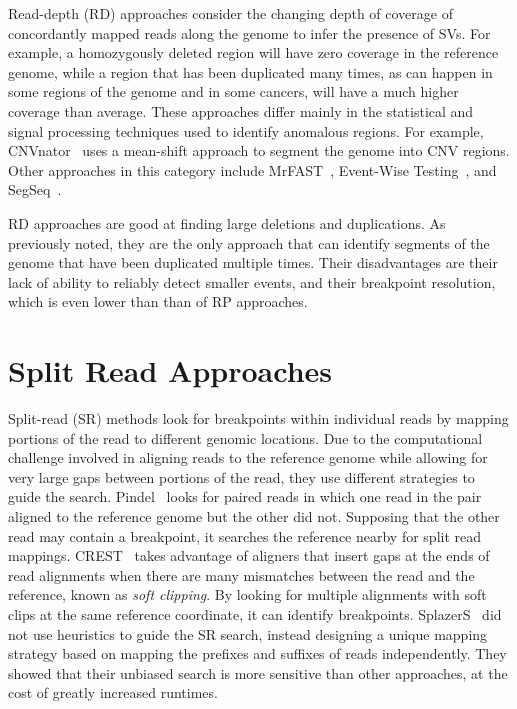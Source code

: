 Read-depth (RD) approaches consider the changing depth of coverage of concordantly mapped reads along the genome to infer the presence of SVs. For example, a homozygously deleted region will have zero coverage in the reference genome, while a region that has been duplicated many times, as can happen in some regions of the genome and in some cancers, will have a much higher coverage than average. These approaches differ mainly in the statistical and signal processing techniques used to identify anomalous regions. For example, CNVnator~\cite{Abyzov:2011bk} uses a mean-shift approach to segment the genome into CNV regions. Other approaches in this category include MrFAST~\cite{Alkan:2009cr}, Event-Wise Testing~\cite{Yoon:2009kb}, and SegSeq~\cite{Chiang:2009di}.

RD approaches are good at finding large deletions and duplications. As previously noted, they are the only approach that can identify segments of the genome that have been duplicated multiple times. Their disadvantages are their lack of ability to reliably detect smaller events, and their breakpoint resolution, which is even lower than than of RP approaches.

\section{Split Read Approaches}

Split-read (SR) methods look for breakpoints within individual reads by mapping portions of the read to different genomic locations. Due to the computational challenge involved in aligning reads to the reference genome while allowing for very large gaps between portions of the read, they use different strategies to guide the search. Pindel~\cite{Ye:2009p2} looks for paired reads in which one read in the pair aligned to the reference genome but the other did not. Supposing that the other read may contain a breakpoint, it searches the reference nearby for split read mappings. CREST~\cite{Wang:2011p1607} takes advantage of aligners that insert gaps at the ends of read alignments when there are many mismatches between the read and the reference, known as \emph{soft clipping}. By looking for multiple alignments with soft clips at the same reference coordinate, it can identify breakpoints. SplazerS~\cite{Emde:2012fb} did not use heuristics to guide the SR search, instead designing a unique mapping strategy based on mapping the prefixes and suffixes of reads independently. They showed that their unbiased search is more sensitive than other approaches, at the cost of greatly increased runtimes.

